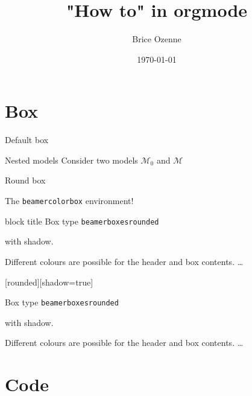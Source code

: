 \documentclass[table]{beamer}
\subtitle{}
\author{Brice Ozenne}
\date{\today}
\title{"How to" in orgmode}
\begin{document}
\maketitle

\section{Box}
\label{sec:org6e4b5ce}

\begin{frame}[label={sec:orgd59bb64}]{Default box}
\begin{block}{Nested models}
	Consider two models $ \mathcal{M}_0 $ and $ \mathcal{M} $
\end{block}
\end{frame}

\begin{frame}[label={sec:org5616252}]{Round box}

\begin{block}{}
	The \texttt{beamercolorbox} environment!
\end{block}

\begin{exampleblock}{block title}
	Box type \texttt{beamerboxesrounded}
	
	with shadow.
	
	Different colours are possible for the header and box contents. \ldots
\end{exampleblock}

[rounded][shadow=true]
\begin{example}
	Box type \texttt{beamerboxesrounded}
	
	with shadow.
	
	Different colours are possible for the header and box contents. \ldots
\end{example}
\end{frame}

\section{Code}
\label{sec:org6bb3e72}
\end{document}
